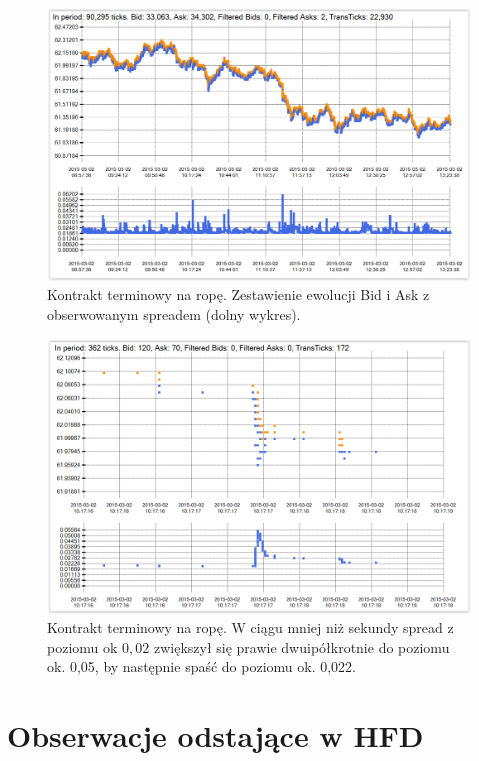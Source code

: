 \documentclass[a4paper,12pt,openany, DIV=calc, headsepline]{scrbook}
\begin{document}
\begin{figure}[H]
  \centering
  \includegraphics[scale=0.5]{wykresy/fBRNJ15.PNG}
  \caption{Kontrakt terminowy na ropę. Zestawienie ewolucji Bid i Ask z obserwowanym spreadem (dolny wykres).}
  \label{fig:fBRNJ15}
\end{figure}

\begin{figure}[H]
  \centering
  \includegraphics[scale=0.5]{wykresy/fBRNJ15Spread.PNG}
  \caption{Kontrakt terminowy na ropę. W ciągu mniej niż sekundy spread z poziomu ok $0,02$ zwiększył się prawie dwuipółkrotnie do poziomu ok. 0,05, by następnie spaść do poziomu ok. 0,022.}
  \label{fig:fBRNJ15Spread}
\end{figure}

\chapter{Obserwacje odstające w HFD}
\end{document}
